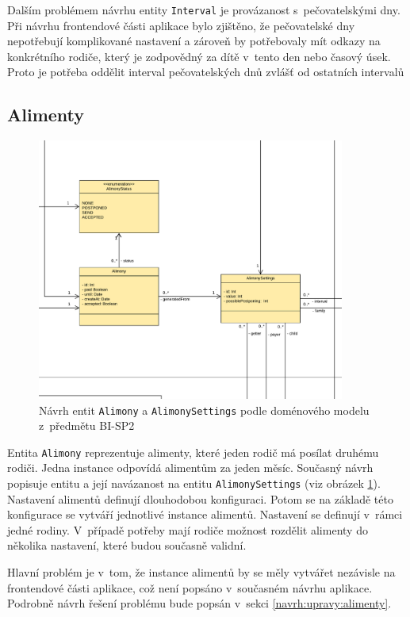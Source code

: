         Dalším problémem návrhu entity \verb|Interval| je provázanost s~pečovatelskými dny. Při návrhu frontendové části aplikace bylo zjištěno, že pečovatelské dny nepotřebují komplikované nastavení a zároveň by potřebovaly mít odkazy na konkrétního rodiče, který je zodpovědný za dítě v~tento den nebo časový úsek. Proto je potřeba oddělit interval pečovatelských dnů zvlášť od ostatních intervalů
    
    \subsection{Alimenty}
        \begin{figure}\centering
	        \includegraphics[width=0.9\textwidth]{pdfs/AlimonyDraft1}
	        \caption[Návrh entit \texttt{Alimony} a \texttt{AlimonySettings}]{Návrh entit \texttt{Alimony} a \texttt{AlimonySettings} podle doménového modelu z~předmětu BI-SP2}\label{image:aliomny-draft1}
        \end{figure}
        Entita \verb|Alimony| reprezentuje alimenty, které jeden rodič má posílat druhému rodiči. Jedna instance odpovídá alimentům za jeden měsíc. Současný návrh popisuje entitu a její navázanost na entitu \verb|AlimonySettings| (viz obrázek \ref{image:aliomny-draft1}). Nastavení alimentů definují dlouhodobou konfiguraci. Potom se na základě této konfigurace se vytváří jednotlivé instance alimentů. Nastavení se definují v~rámci jedné rodiny. V~případě potřeby mají rodiče možnost rozdělit alimenty do několika nastavení, které budou současně validní.
        
        Hlavní problém je v~tom, že instance alimentů by se měly vytvářet nezávisle na frontendové části aplikace, což není popsáno v~současném návrhu aplikace. Podrobně návrh řešení problému bude popsán v~sekci \ref{navrh:upravy:alimenty}.
        
